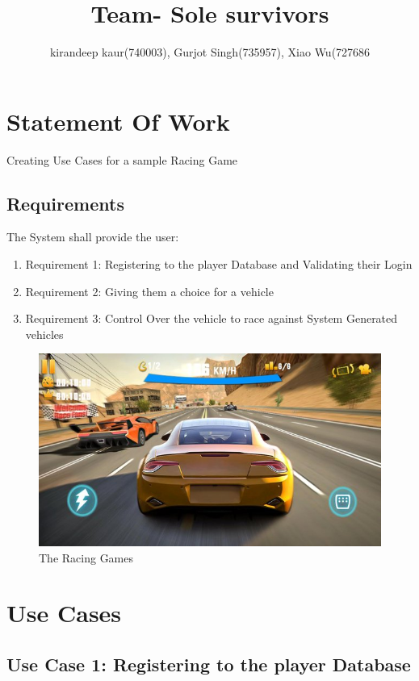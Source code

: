 \documentclass{article}
\title{Team- Sole survivors}
\author{kirandeep kaur(740003), Gurjot Singh(735957), Xiao Wu(727686}
\date{}
\begin{document}
\maketitle

\section{Statement Of Work}
Creating Use Cases for a sample Racing Game
\subsection{Requirements}
The System shall provide the user:

\begin{enumerate}
    \item  Requirement 1: Registering to the player Database and Validating their Login
    \item  Requirement 2: Giving them a choice for a vehicle
    \item  Requirement 3: Control Over the vehicle to race against System Generated vehicles

\end{enumerate}


\begin{figure}[h!]
\centering
\includegraphics[scale=0.5]{car}
\caption{The Racing Games}
\label{fig:car}
\end{figure}


\pagebreak
\section{Use Cases}
\subsection{Use Case 1: Registering to the player Database}
\end{document}
